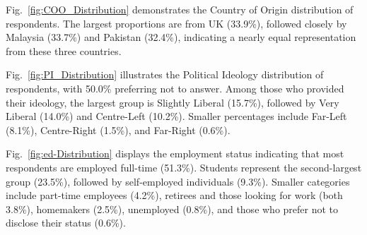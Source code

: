 \documentclass[pt]{article}  %
\begin{document}
Fig.~\ref{fig:COO_Distribution} demonstrates the Country of Origin distribution of respondents. The largest proportions are from UK (33.9\%), followed closely by Malaysia (33.7\%) and Pakistan (32.4\%), indicating a nearly equal representation from these three countries.


Fig.~\ref{fig:PI_Distribution} illustrates the Political Ideology distribution of respondents, with 50.0\% preferring not to answer. Among those who provided their ideology, the largest group is Slightly Liberal (15.7\%), followed by Very Liberal (14.0\%) and Centre-Left (10.2\%). Smaller percentages include Far-Left (8.1\%), Centre-Right (1.5\%), and Far-Right (0.6\%).



Fig.~\ref{fig:ed-Distribution} displays the employment status indicating
 that most respondents are employed full-time (51.3\%). Students represent the second-largest group (23.5\%), followed by self-employed individuals (9.3\%). Smaller categories include part-time employees (4.2\%), retirees and those looking for work (both 3.8\%), homemakers (2.5\%), unemployed (0.8\%), and those who prefer not to disclose their status (0.6\%).
\end{document}
